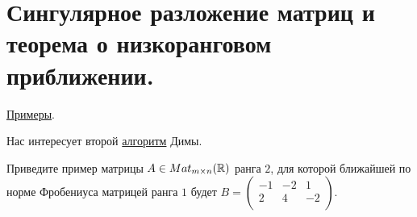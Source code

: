 \documentclass[a4paper]{article}
\begin{document}
    \newpage
    \section{Сингулярное разложение матриц и теорема о низкоранговом приближении.}

    \href{https://www.dropbox.com/s/wkjqmpauc3ubwdk/SVD_examples.pdf?dl=0}{Примеры}.

    Нас интересует второй \href{https://docviewer.yandex.ru/view/286099993/?page=2&*=2bjDoGK8PW%2FggxgTJGXiN51nVBl7InVybCI6InlhLWRpc2stcHVibGljOi8vNVhNeGdORnVtNjBWcGRJV04vVzdCbTYzMU9POUZCYUswWktLSWxGVk85aG96dCt3Zlg4Q2pOcCs0NWpHMnh4Q3EvSjZicG1SeU9Kb25UM1ZvWG5EYWc9PTovU2VtaW5hcjMxX2FsZ29yaXRobXMucGRmIiwidGl0bGUiOiJTZW1pbmFyMzFfYWxnb3JpdGhtcy5wZGYiLCJub2lmcmFtZSI6ZmFsc2UsInVpZCI6IjI4NjA5OTk5MyIsInRzIjoxNTkxNzQ1NjI3MDEzLCJ5dSI6IjU0Mjk1MDEzNDE1NjU1MjYzNjIifQ%3D%3D}{алгоритм} Димы.

    Приведите пример матрицы $A \in Mat_{m \times n}(\mathbb{R})$ ранга $2$, для которой ближайшей по норме Фробениуса матрицей ранга $1$ будет $B = \begin{pmatrix}
        -1 & -2 & 1 \\
        2 & 4 & -2 \\
    \end{pmatrix}$.
\end{document}
